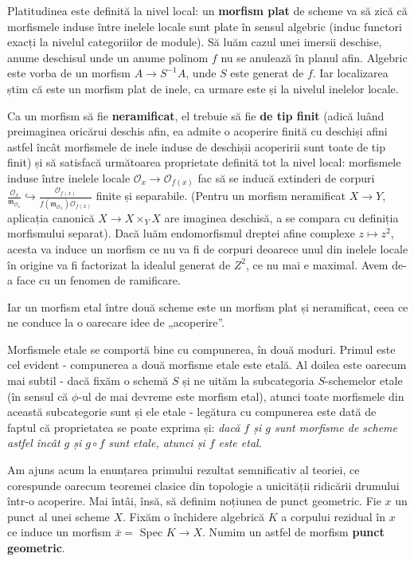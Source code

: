\documentclass[13pt,openany]{book}
\begin{document}
Platitudinea este definită la nivel local: un {\bf morfism plat} de scheme va să zică că morfismele induse între inelele locale sunt plate în sensul algebric (induc functori exacți la nivelul categoriilor de module). Să luăm cazul unei imersii deschise, anume deschisul unde un anume polinom $f$ nu se anulează în planul afin. Algebric este vorba de un morfism $A \to S^{-1}A$, unde $S$ este generat de $f$. Iar localizarea știm că este un morfism plat de inele, ca urmare este și la nivelul inelelor locale.

Ca un morfism să fie {\bf neramificat}, el trebuie să fie {\bf de tip finit} (adică luând preimaginea oricărui deschis afin, ea admite o acoperire finită cu deschiși afini astfel încât morfismele de inele induse de deschișii acoperirii sunt toate de tip finit) și să satisfacă următoarea proprietate definită tot la nivel local: morfismele induse între inelele locale $\mathcal{O}_x \rightarrow \mathcal{O}_{f(x)}$ fac să se inducă extinderi de corpuri $\frac{\mathcal{O}_x}{\mathfrak{m}_{\mathcal{O}_x}} \hookrightarrow \frac{\mathcal{O}_{f(x)}}{f(\mathfrak{m}_{\mathcal{O}_x})\mathcal{O}_{f(x)}}$ finite și separabile. (Pentru un morfism neramificat $X \rightarrow Y$, aplicația canonică $X \rightarrow X\times_Y X$ are imaginea deschisă, a se compara cu definiția morfismului separat). Dacă luăm endomorfismul dreptei afine complexe $z \mapsto z^2$, acesta va induce un morfism ce nu va fi de corpuri deoarece unul din inelele locale în origine va fi factorizat la idealul generat de $Z^2$, ce nu mai e maximal. Avem de-a face cu un fenomen de ramificare.

Iar un morfism etal între două scheme este un morfism plat și neramificat, ceea ce ne conduce la o oarecare idee de „acoperire”.

Morfismele etale se comportă bine cu compunerea, în două moduri. Primul este cel evident - compunerea a două morfisme etale este etală. Al doilea este oarecum mai subtil - dacă fixăm o schemă $S$ și ne uităm la subcategoria $S$-schemelor etale (în sensul că $\phi$-ul de mai devreme este morfism etal), atunci toate morfismele din această subcategorie sunt și ele etale - legătura cu compunerea este dată de faptul că proprietatea se poate exprima și: {\it dacă $f$ și $g$ sunt morfisme de scheme astfel încât $g$ și $g \circ f$ sunt etale, atunci și $f$ este etal}.

Am ajuns acum la enunțarea primului rezultat semnificativ al teoriei, ce corespunde oarecum teoremei clasice din topologie a unicității ridicării drumului într-o acoperire. Mai întâi, însă, să definim noțiunea de punct geometric. Fie $x$ un punct al unei scheme $X$. Fixăm o închidere algebrică $K$ a corpului rezidual în $x$ ce induce un morfism $\bar{x}=$ Spec $K\rightarrow X$. Numim un astfel de morfism {\bf punct geometric}.
\end{document}
